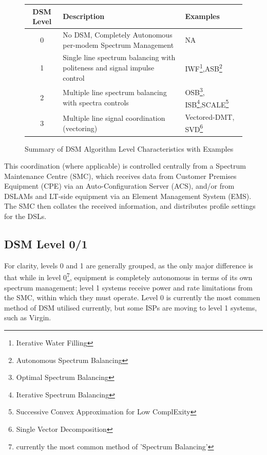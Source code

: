 \begin{figure}[h!]
  \begin{minipage}{\textwidth}
\begin{tabularx}{\textwidth}{c|X|p{3cm}|}
  DSM Level&Description&Examples\\\hline
  0&No DSM, Completely Autonomous per-modem Spectrum Management&NA \\
  1&Single line spectrum balancing with politeness and signal impulse control&IWF\footnote{Iterative Water Filling},ASB\footnote{Autonomous Spectrum Balancing}\\
  2&Multiple line spectrum balancing with spectra controls&OSB\footnote{Optimal Spectrum Balancing}, ISB\footnote{Iterative Spectrum Balancing},SCALE\footnote{Successive Convex Approximation for Low ComplExity\cite{Pap06}}\\
  3&Multiple line signal coordination (vectoring)&Vectored-DMT\cite{GG00}, SVD\footnote{Single Vector Decomposition\cite{GTaWH00}}\\
\end{tabularx}
\end{minipage}
\caption{Summary of DSM Algorithm Level Characteristics with Examples}
\label{tab:DSMLevelTable}
\end{figure}


This coordination (where applicable) is controlled centrally from a Spectrum Maintenance Centre (SMC), which receives data from Customer Premises Equipment (CPE) via an Auto-Configuration Server (ACS), and/or from DSLAMs and LT-side equipment via an Element Management System (EMS). The SMC then collates the received information, and distributes profile settings for the DSLs.

\subsection{DSM Level 0/1}
For clarity, levels 0 and 1 are generally grouped, as the only major difference is that while in level 0\footnote{currently the most common method of 'Spectrum Balancing'}, equipment is completely autonomous in terms of its own spectrum management; level 1 systems receive power and rate limitations from the SMC, within which they must operate. Level 0 is currently the most commen method of DSM utilised currently, but some ISPs are moving to level 1 systems, such as Virgin.

